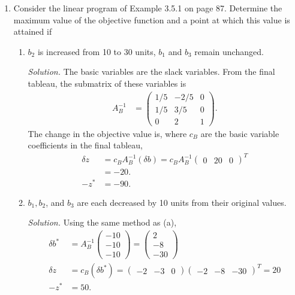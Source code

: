 \documentclass{homework}
\newcommand{\solution}{	\vspace{1em} \textit{Solution.} \quad }
\newcommand{\bolditem}[1][YYY]{\item[\textbf{#1}]}
\begin{document}
\begin{enumerate}
		
		\bolditem[5.5.2] Consider the linear program of Example 3.5.1 on page 87. Determine the maximum value of the objective function and a point at which this value is attained if \begin{enumerate}
			\item $b_2$ is increased from 10 to 30 units, $b_1$ and $b_3$ remain unchanged.
				
				\solution The basic variables are the slack variables. From the final tableau, the submatrix of these variables is \begin{align*}
					A_B^{-1} & = \begin{pmatrix}
						1/5 & -2/5 & 0 \\
						1/5 & 3/5 & 0 \\
						0 & 2 & 1
					\end{pmatrix}.
				\end{align*}
				The change in the objective value is, where $c_B$ are the basic variable coefficients in the final tableau, \begin{align*}
					\delta z & = c_B A_B^{-1} (\delta b) = c_B A_B^{-1} \begin{pmatrix}
						0 & 20 & 0
					\end{pmatrix}^T \\
					& = -20. \\
					-z^* & = -90.
				\end{align*}
				
			\item $b_1, b_2$, and $b_3$ are each decreased by 10 units from their original values.
				
				\solution Using the same method as (a), \begin{align*}
					\delta b^* & = A_B^{-1} \begin{pmatrix}
						-10 \\ -10 \\ -10
					\end{pmatrix} = \begin{pmatrix}
						2 \\ -8 \\ -30	
					\end{pmatrix} \\
					\delta z & = c_B (\delta b^*) = \begin{pmatrix}
						-2 & -3 & 0
					\end{pmatrix} \begin{pmatrix}
					-2 & -8 & -30
				\end{pmatrix}^T = 20 \\
				-z^* & = 50.
				\end{align*}
		\end{enumerate}
	

\end{enumerate}
\end{document}

